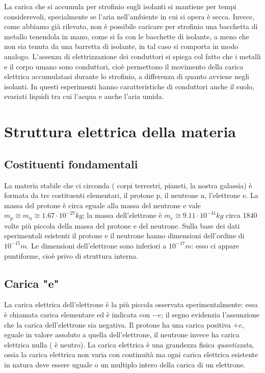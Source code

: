 \documentclass[class=book, crop=false, oneside, 12pt]{standalone}
\begin{document}
La carica che si accumula per strofinio sugli isolanti si mantiene per tempi considerevoli, specialmente se l'aria nell'ambiente in cui si opera è secca. 
Invece, come abbiamo già rilevato, non è possibile caricare per strofinio una bacchetta di metallo tenendola in mano, come si fa con le bacchette di isolante, a meno che non sia tenuta da una barretta di isolante, in tal caso si comporta in modo analogo.
L'assenza di elettrizzazione dei conduttori si spiega col fatto che i metalli e il corpo umano sono conduttori, cioè permettono il movimento della carica elettrica accumulatasi durante lo strofinio, a differenza di quanto avviene negli isolanti.
In questi esperimenti hanno caratteristiche di conduttori anche il suolo, svariati liquidi tra cui l'acqua e anche l'aria umida.

\section{Struttura elettrica della materia}

\subsection{Costituenti fondamentali}

La materia stabile che ci circonda ( corpi terrestri, pianeti, la nostra galassia) è formata da tre costituenti elementari, il protone p, il neutrone n, l'elettrone e.
La massa del protone è circa eguale alla massa del neutrone e vale \(m_p \cong m_n \cong 1.67 \cdot 10^{-27} kg \); la massa dell'elettrone è \(m_e \cong 9.11 \cdot 10^{-31} kg\) circa 1840 volte più piccola della massa del protone e del neutrone.
Sulla base dei dati sperimentali esistenti il protone e il neutrone hanno dimensioni dell'ordine di \(10^{-15} m\).
Le dimensioni dell'elettrone sono inferiori a \(10^{-17} m\): esso ci appare puntiforme, cioè privo di struttura interna.

\subsection{Carica "e"}

La carica elettrica dell'elettrone è la più piccola osservata sperimentalmente: essa è chiamata carica elementare ed è indicata con \(-e\); il segno evidenzia l'assunzione che la carica dell'elettrone sia negativa. 
Il protone ha una carica positiva \(+e\), eguale in valore assoluto a quella dell'elettrone, il neutrone invece ha carica elettrica nulla ( è neutro).
La carica elettrica è una grandezza fisica \emph{quantizzata}, ossia la carica elettrica non varia con continuità ma ogni carica elettrica esistente in natura deve essere uguale o un multiplo intero della carica di un elettrone.
\end{document}
